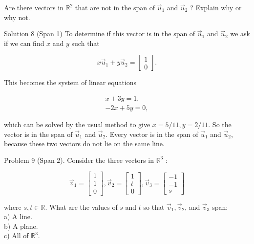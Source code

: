 \documentclass[10pt]{article}
\begin{document}
Are there vectors in $\mathbb{R}^{2}$ that are not in the span of $\vec{u}_{1}$ and $\vec{u}_{2}$ ? Explain why or why not.

Solution 8 (Span 1) To determine if this vector is in the span of $\vec{u}_{1}$ and $\vec{u}_{2}$ we ask if we can find $x$ and $y$ such that

$$
x \vec{u}_{1}+y \vec{u}_{2}=\left[\begin{array}{l}
1 \\
0
\end{array}\right] .
$$

This becomes the system of linear equations

$$
\begin{array}{r}
x+3 y=1, \\
-2 x+5 y=0,
\end{array}
$$

which can be solved by the usual method to give $x=5 / 11, y=2 / 11$. So the vector is in the span of $\vec{u}_{1}$ and $\vec{u}_{2}$. Every vector is in the span of $\vec{u}_{1}$ and $\vec{u}_{2}$, because these two vectors do not lie on the same line.

Problem 9 (Span 2). Consider the three vectors in $\mathbb{R}^{3}$ :

$$
\vec{v}_{1}=\left[\begin{array}{l}
1 \\
1 \\
0
\end{array}\right], \vec{v}_{2}=\left[\begin{array}{l}
1 \\
t \\
0
\end{array}\right], \vec{v}_{3}=\left[\begin{array}{c}
-1 \\
-1 \\
s
\end{array}\right]
$$

where $s, t \in \mathbb{R}$. What are the values of $s$ and $t$ so that $\vec{v}_{1}, \vec{v}_{2}$, and $\vec{v}_{3}$ span:\\
a) A line.\\
b) A plane.\\
c) All of $\mathbb{R}^{3}$.
\end{document}
